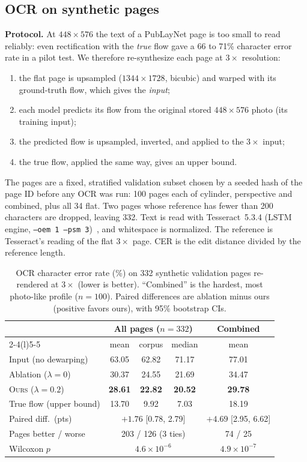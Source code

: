 \documentclass[a4paper,fleqn]{cas-sc}
\newcommand{\ours}{\textsc{Ours}}
\begin{document}
\subsection{OCR on synthetic pages}
\label{sec:ocrsyn}
\textbf{Protocol.} At $448\times576$ the text of a PubLayNet page is too small to read reliably: even rectification with the \emph{true} flow gave a 66 to 71\% character error rate in a pilot test. We therefore re-synthesize each page at $3\times$ resolution:
\begin{enumerate}
\item the flat page is upsampled ($1344\times1728$, bicubic) and warped with its ground-truth flow, which gives the \emph{input};
\item each model predicts its flow from the original stored $448\times576$ photo (its training input);
\item the predicted flow is upsampled, inverted, and applied to the $3\times$ input;
\item the true flow, applied the same way, gives an upper bound.
\end{enumerate}
The pages are a fixed, stratified validation subset chosen by a seeded hash of the page ID before any OCR was run: 100 pages each of cylinder, perspective and combined, plus all 34 flat. Two pages whose reference has fewer than 200 characters are dropped, leaving 332. Text is read with Tesseract~5.3.4 (LSTM engine, \texttt{--oem 1 --psm 3})~\cite{smith2007tesseract}, and whitespace is normalized. The reference is Tesseract's reading of the flat $3\times$ page. CER is the edit distance divided by the reference length.

\begin{table}[t]
\centering
\caption{OCR character error rate (\%) on 332 synthetic validation pages re-rendered at $3\times$ (lower is better). ``Combined'' is the hardest, most photo-like profile ($n=100$). Paired differences are ablation minus ours (positive favors ours), with 95\% bootstrap CIs.}
\label{tab:ocr}
\setlength{\tabcolsep}{5pt}
\begin{tabular}{@{}lcccc@{}}
\toprule
 & \multicolumn{3}{c}{All pages ($n=332$)} & Combined \\
\cmidrule(lr){2-4}\cmidrule(l){5-5}
 & mean & corpus & median & mean \\
\midrule
Input (no dewarping) & 63.05 & 62.82 & 71.17 & 77.01 \\
Ablation ($\lambda=0$) & 30.37 & 24.55 & 21.69 & 34.47 \\
\ours{} ($\lambda=0.2$) & \textbf{28.61} & \textbf{22.82} & \textbf{20.52} & \textbf{29.78} \\
True flow (upper bound) & 13.70 & 9.92 & 7.03 & 18.19 \\
\midrule
Paired diff.\ (pts) & \multicolumn{3}{c}{$+1.76$ [0.78, 2.79]} & $+4.69$ [2.95, 6.62] \\
Pages better / worse & \multicolumn{3}{c}{203 / 126 (3 ties)} & 74 / 25 \\
Wilcoxon $p$ & \multicolumn{3}{c}{$4.6\times10^{-6}$} & $4.9\times10^{-7}$ \\
\bottomrule
\end{tabular}
\end{table}
\end{document}
